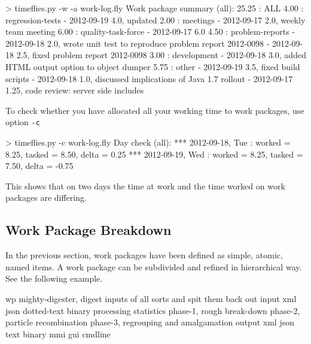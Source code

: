 \documentclass[11pt]{article}
\begin{document}
\begin{inputfile}
> timeflies.py -w -a work-log.fly 
Work package summary (all):
 25.25 : ALL
      4.00 : regression-tests
             - 2012-09-19 4.0, updated
      2.00 : meetings
             - 2012-09-17 2.0, weekly team meeting
      6.00 : quality-task-force
             - 2012-09-17 6.0
      4.50 : problem-reports
             - 2012-09-18 2.0, wrote unit test to reproduce problem report 2012-0098
             - 2012-09-18 2.5, fixed problem report 2012-0098
      3.00 : development
             - 2012-09-18 3.0, added HTML output option to object dumper
      5.75 : other
             - 2012-09-19 3.5, fixed build scripts
             - 2012-09-18 1.0, discussed implications of Java 1.7 rollout
             - 2012-09-17 1.25, code review: server side includes
\end{inputfile}

To check whether you have allocated all your working time to work packages, use option \verb:-c:

\begin{inputfile}
> timeflies.py -c work-log.fly 
Day check (all):
*** 2012-09-18, Tue : worked =  8.25, tasked =  8.50, delta =  0.25
*** 2012-09-19, Wed : worked =  8.25, tasked =  7.50, delta = -0.75
\end{inputfile}

This shows that on two days the time at work and the time worked on work packages are differing.




\subsection{Work Package Breakdown}

In the previous section, work packages have been defined as simple, atomic, named items. A work package can be subdivided and refined in hierarchical way. See the following example.

\begin{inputfile}
wp mighty-digester, digest inputs of all sorts and spit them back out
    input
        xml
        json
        dotted-text
        binary
    processing
        statistics
        phase-1, rough break-down
        phase-2, particle recombination
        phase-3, regrouping and amalgamation
    output
        xml
        json
        text
        binary
    mmi
        gui
        cmdline
\end{inputfile}
\end{document}
